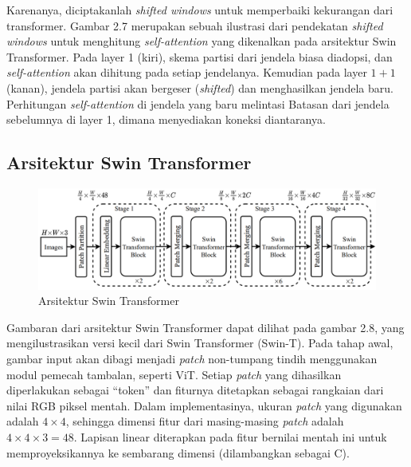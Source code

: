Karenanya, diciptakanlah \emph{shifted windows} untuk memperbaiki kekurangan dari \linebreak transformer. Gambar 2.7 merupakan sebuah ilustrasi dari pendekatan \emph{shifted windows} 
untuk menghitung \emph{self-attention} yang dikenalkan pada arsitektur Swin Transformer. Pada layer 1 (kiri), skema partisi dari jendela biasa diadopsi, dan \emph{self-attention} 
akan dihitung pada setiap jendelanya. Kemudian pada layer \begin{math}1+1\end{math} (kanan), jendela partisi akan bergeser (\emph{shifted}) dan menghasilkan jendela baru. Perhitungan 
\emph{self-attention} di jendela yang baru melintasi Batasan dari jendela sebelumnya di layer 1, dimana menyediakan koneksi diantaranya. \parencite{Liu2021}

\subsection{Arsitektur Swin Transformer}

\begin{figure}[ht]
  \centering
  \includegraphics[scale=0.4]{gambar/Arsitektur Swin.png}
  \caption{Arsitektur Swin Transformer}
  \label{fig:arsitekturswintransformer}
\end{figure}

Gambaran dari arsitektur Swin Transformer dapat dilihat pada gambar 2.8, yang mengilustrasikan versi kecil dari Swin Transformer (Swin-T). Pada tahap awal, gambar input akan 
dibagi menjadi \emph{patch} non-tumpang tindih menggunakan modul pemecah tambalan, seperti ViT. Setiap \emph{patch} yang dihasilkan diperlakukan sebagai “token” dan fiturnya ditetapkan sebagai 
rangkaian dari nilai RGB piksel mentah. Dalam implementasinya, ukuran \emph{patch} yang digunakan adalah \begin{math}4 \times 4\end{math}, sehingga dimensi fitur dari masing-masing \emph{patch} adalah 
\begin{math}4 \times 4 \times 3 = 48\end{math}. Lapisan linear diterapkan pada fitur bernilai mentah ini untuk memproyeksikannya ke sembarang dimensi (dilambangkan sebagai C). \parencite{Liu2021}

